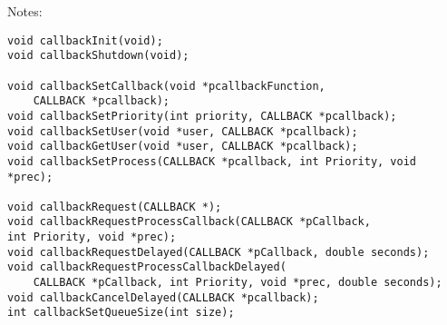 Notes:
\begin{verbatim}
void callbackInit(void);
void callbackShutdown(void);

void callbackSetCallback(void *pcallbackFunction,
    CALLBACK *pcallback);
void callbackSetPriority(int priority, CALLBACK *pcallback);
void callbackSetUser(void *user, CALLBACK *pcallback);
void callbackGetUser(void *user, CALLBACK *pcallback);
void callbackSetProcess(CALLBACK *pcallback, int Priority, void *prec);

void callbackRequest(CALLBACK *);
void callbackRequestProcessCallback(CALLBACK *pCallback,
int Priority, void *prec);
void callbackRequestDelayed(CALLBACK *pCallback, double seconds);
void callbackRequestProcessCallbackDelayed(
    CALLBACK *pCallback, int Priority, void *prec, double seconds);
void callbackCancelDelayed(CALLBACK *pcallback);
int callbackSetQueueSize(int size);
\end{verbatim}


